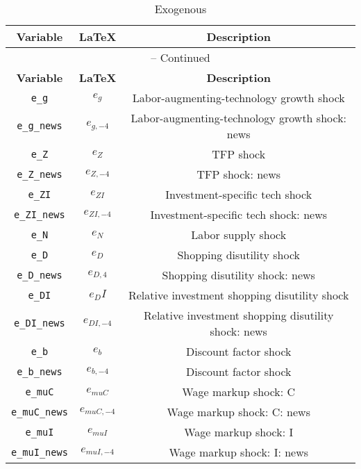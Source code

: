 \begin{center}
\begin{longtable}{ccc}
\caption{Exogenous}\\%
\hline%
\multicolumn{1}{c}{\textbf{Variable}} &
\multicolumn{1}{c}{\textbf{\LaTeX}} &
\multicolumn{1}{c}{\textbf{Description}}\\%
\hline\hline%
\endfirsthead
\multicolumn{3}{c}{{\tablename} \thetable{} -- Continued}\\%
\hline%
\multicolumn{1}{c}{\textbf{Variable}} &
\multicolumn{1}{c}{\textbf{\LaTeX}} &
\multicolumn{1}{c}{\textbf{Description}}\\%
\hline\hline%
\endhead
\texttt{e\_g} & ${e_g}$ & Labor-augmenting-technology growth shock\\
\texttt{e\_g\_news} & ${e_{g,-4}}$ & Labor-augmenting-technology growth shock: news\\
\texttt{e\_Z} & ${e_Z}$ & TFP shock\\
\texttt{e\_Z\_news} & ${e_{Z,-4}}$ & TFP shock: news\\
\texttt{e\_ZI} & ${e_{ZI}}$ & Investment-specific tech shock\\
\texttt{e\_ZI\_news} & ${e_{ZI,-4}}$ & Investment-specific tech shock: news\\
\texttt{e\_N} & ${e_N}$ & Labor supply shock\\
\texttt{e\_D} & ${e_D}$ & Shopping disutility shock\\
\texttt{e\_D\_news} & ${e_{D,4}}$ & Shopping disutility shock: news\\
\texttt{e\_DI} & ${e_DI}$ & Relative investment shopping disutility shock\\
\texttt{e\_DI\_news} & ${e_{DI,-4}}$ & Relative investment shopping disutility shock: news\\
\texttt{e\_b} & ${e_b}$ & Discount factor shock\\
\texttt{e\_b\_news} & ${e_{b,-4}}$ & Discount factor shock\\
\texttt{e\_muC} & ${e_{muC}}$ & Wage markup shock: C\\
\texttt{e\_muC\_news} & ${e_{muC,-4}}$ & Wage markup shock: C: news\\
\texttt{e\_muI} & ${e_{muI}}$ & Wage markup shock: I\\
\texttt{e\_muI\_news} & ${e_{muI,-4}}$ & Wage markup shock: I: news\\
\hline%
\end{longtable}
\end{center}
